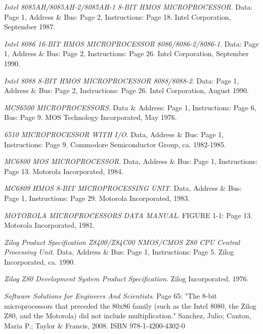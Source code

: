 \documentclass[twoside,twocolumn]{article}
\begin{document}
\begin{thebibliography}{99}
\textit{Intel 8085AH/8085AH-2/8085AH-1 8-BIT HMOS MICROPROCESSOR}.
Data: Page 1, Address \& Bus: Page 2, Instructions: Page 18.
Intel Corporation, September 1987.

\textit{Intel 8086 16-BIT HMOS MICROPROCESSOR 8086/8086-2/8086-1}.
Data: Page 1, Address \& Bus: Page 2, Instructions: Page 26.
Intel Corporation, September 1990.

\textit{Intel 8088 8-BIT HMOS MICROPROCESSOR 8088/8088-2}.
Data: Page 1, Address \& Bus: Page 2, Instructions: Page 26.
Intel Corporation, August 1990.

\textit{MCS6500 MICROPROCESSORS}.
Data \& Address: Page 1, Instructions: Page 6, Bus: Page 9.
MOS Technology Incorporated, May 1976.

\textit{6510 MICROPROCESSOR WITH I/O}.
Data, Address \& Bus: Page 1, Instructions: Page 9.
Commodore Semiconductor Group, ca. 1982-1985.

\textit{MC6800 MOS MICROPROCESSOR}.
Data, Address \& Bus: Page 1, Instructions: Page 13.
Motorola Incorporated, 1984.

\textit{MC6809 HMOS 8-BIT MICROPROCESSING UNIT}.
Data, Address \& Bus: Page 1, Instructions: Page 29.
Motorola Incorporated, 1983.

\textit{MOTOROLA MICROPROCESSORS DATA MANUAL}.
FIGURE 1-1: Page 13.
Motorola Incorporated, 1981.

\textit{Zilog Product Specification Z8400/Z84C00 NMOS/CMOS Z80\textsuperscript{\textregistered} CPU Central Processing Unit}.
Data, Address \& Bus: Page 1, Instructions: Page 5.
Zilog Incorporated, ca. 1990.

\textit{Zilog Z80 Development System Product Specification}.
Zilog Incorporated, 1976.

\textit{Software Solutions for Engineers And Scientists}.
Page 65: "The 8-bit microprocessors that preceded the 80x86 family (such as the Intel 8080, the Zilog Z80, and the Motorola) did not include multiplication."
Sanchez, Julio; Canton, Maria P.; Taylor \& Francis, 2008.
ISBN 978-1-4200-4302-0


\end{thebibliography}

\end{document}

